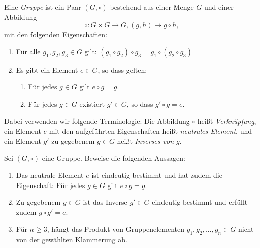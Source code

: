 \documentclass{book}
\begin{document}
\begin{defi}\label{defi:category} Eine {\em Gruppe} ist ein Paar $(G,\circ)$ bestehend aus einer Menge $G$ und einer Abbildung
    \[
        \circ: G \times G \to G, (g,h) \mapsto g \circ h, 
    \]
    mit den folgenden Eigenschaften: 
    \begin{enumerate}[label=(G\arabic*)]
        \item\label{it:g1} Für alle $g_1,g_2,g_3 \in G$ gilt: $(g_1 \circ g_2) \circ g_3 = g_1 \circ (g_2 \circ g_3)$
        \item\label{it:g2} Es gibt ein Element $e \in G$, so dass gelten:
    \begin{enumerate}[label=(G2.\arabic*)]
        \item\label{it:g21} Für jedes $g \in G$ gilt $e \circ g = g$.
        \item\label{it:g22} Für jedes $g \in G$ existiert $g' \in G$, so dass $g' \circ g = e$. 
    \end{enumerate}
    \end{enumerate}     
    Dabei verwenden wir folgende Terminologie: Die Abbildung $\circ$ heißt
    {\em Verknüpfung}, ein Element $e$ mit den aufgeführten Eigenschaften
    heißt {\em neutrales Element}, und ein Element $g'$ zu gegebenem $g \in G$
    heißt {\em Inverses von $g$}.
\end{defi}

\begin{prob}\label{prob:gruppe} Sei $(G,\circ)$ eine Gruppe. Beweise die folgenden Aussagen:
    \begin{enumerate}
        \item Das neutrale Element $e$ ist eindeutig bestimmt und hat zudem die Eigenschaft: Für jedes $g \in G$ gilt $e \circ g = g$.
        \item Zu gegebenem $g \in G$ ist das Inverse $g' \in G$ eindeutig bestimmt und erfüllt zudem $g \circ g' = e$. 
        \item Für $n \ge 3$, hängt das Produkt von Gruppenelementen $g_1, g_2, ..., g_n \in G$ nicht von der gewählten Klammerung ab.
    \end{enumerate}
\end{prob}
\end{document}
